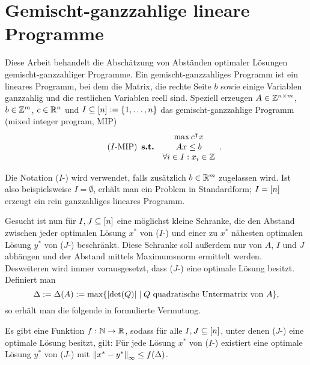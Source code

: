 \section{Gemischt-ganzzahlige lineare Programme}\label{introduction}

Diese Arbeit behandelt die Abschätzung von Abständen optimaler Lösungen
gemischt-ganzzahliger Programme.
Ein gemischt-ganzzahliges Programm ist ein lineares Programm, bei dem die
Matrix, die rechte Seite $b$ sowie einige Variablen ganzzahlig und die
restlichen Variablen reell sind.
Speziell erzeugen $A\in\mathbb{Z}^{n\times m}$, $b\in\mathbb{Z}^m$, $c\in\mathbb{R}^n$ und $I\subseteq[n]:=\{1,\dots,n\}$ das gemischt-ganzzahlige Programm (mixed integer program, MIP)
\begin{equation}\tag{$I$-\MIPI}
\begin{array}{lc}
	&\max c\transpose x \\
	\subjectTo &Ax\leq b\\
	&\forall i\in I: x_i\in\Z
\end{array}.
\end{equation}

Die Notation ($I$-\MIPR) wird verwendet, falls zusätzlich $b\in\mathbb{R}^m$ zugelassen wird.
Ist also beispielsweise $I=\emptyset$, erhält man ein Problem in Standardform; $I=[n]$ erzeugt ein rein ganzzahliges lineares Programm.

Gesucht ist nun für $I,J\subseteq[n]$ eine möglichst kleine Schranke, die den Abstand zwischen jeder optimalen Lösung $x^*$ von ($I$-\MIPI) und einer zu $x^*$ nähesten optimalen Lösung $y^*$ von ($J$-\MIPI) beschränkt.
Diese Schranke soll außerdem nur von $A$, $I$ und $J$ abhängen und der Abstand mittels Maximumsnorm ermittelt werden.
Desweiteren wird immer vorausgesetzt, dass ($J$-\MIPI) eine optimale Lösung besitzt.
Definiert man
$$\Delta:=\Delta(A):=\max\{\lvert  \det(Q) \rvert \mid Q \text{ quadratische Untermatrix von } A \},$$
so erhält man die folgende in \cite{Paat2018} formulierte Vermutung.

\begin{conjecture}\label{con:delta}
	Es gibt eine Funktion $f: \mathbb{N}\rightarrow\mathbb{R}$, sodass für alle $I,J\subseteq[n]$, unter denen ($J$-\MIPI) eine optimale Lösung besitzt, gilt:
	Für jede Lösung $x^*$ von ($I$-\MIPI) existiert eine optimale 
	Lösung $y^*$ von ($J$-\MIPI) mit $\left\lVert x^* - y^*\right\rVert_\infty\leq f(\Delta)$.
\end{conjecture}

